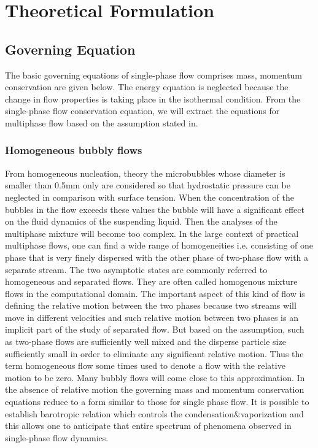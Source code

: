 \chapter{Theoretical Formulation}
\label{chap:chapter2}

\section{Governing Equation}
The basic governing equations of single-phase flow comprises mass,
momentum conservation are given below. The energy equation is
neglected because the change in flow properties is taking place in the
isothermal condition.  From the single-phase flow conservation
equation, we will extract the equations for multiphase flow based on
the assumption stated
in\cite{CavitationandBubbleDynamics.1995,Hidalgo2014}.\\

\subsection{Homogeneous bubbly flows}
From homogeneous nucleation, theory
\cite{FundamentalsofCavitation.2004}the microbubbles whose diameter is
smaller than 0.5mm only are considered so that hydrostatic pressure
can be neglected in comparison with surface tension. When the
concentration of the bubbles in the flow exceeds these values the
bubble will have a significant effect on the fluid dynamics of the
suspending liquid.  Then the analyses of the multiphase mixture will
become too complex. In the large context of practical multiphase
flows, one can find a wide range of homogeneities i.e. consisting of
one phase that is very finely dispersed with the other phase of
two-phase flow with a separate stream. The two asymptotic states are
commonly referred to homogeneous and separated flows. They are often
called homogenous mixture flows in the computational domain. The
important aspect of this kind of flow is defining the relative motion
between the two phases because two streams will move in different
velocities and such relative motion between two phases is an implicit
part of the study of separated flow. But based on the assumption, such
as two-phase flows are sufficiently well mixed and the disperse
particle size sufficiently small in order to eliminate any significant
relative motion. Thus the term homogeneous flow some times used to
denote a flow with the relative motion to be zero.  Many bubbly flows
will come close to this approximation. In the absence of relative
motion the governing mass and momentum conservation equations reduce
to a form similar to those for single phase flow.  It is possible to
establish barotropic relation which controls the
condensation$\&$vaporization and this allows one to anticipate that
entire spectrum of phenomena observed in single-phase flow dynamics.

